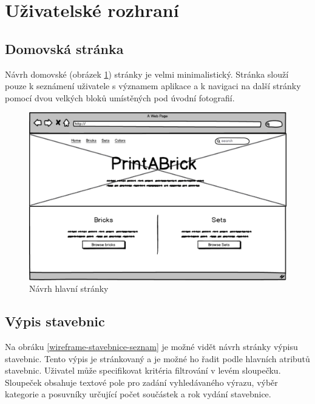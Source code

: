 \section{Uživatelské rozhraní}

\subsection{Domovská stránka}
Návrh domovské (obrázek \ref{wireframe-hlavni}) stránky je velmi minimalistický. Stránka slouží pouze k seznámení uživatele s významem aplikace a k navigaci na další stránky pomocí dvou velkých bloků umístěných pod úvodní fotografií.

\begin{figure}[htbp]
    \centering
    \includegraphics[width=\textwidth,height=\textheight,keepaspectratio]{pdfs/wireframe_home.pdf}
    \caption{Návrh hlavní stránky}\label{wireframe-hlavni}
\end{figure}


\subsection{Výpis stavebnic}
Na obráku \ref{wireframe-stavebnice-seznam} je možné vidět návrh stránky výpisu stavebnic. Tento výpis je stránkovaný a je možné ho řadit podle hlavních atributů stavebnic. Uživatel může specifikovat kritéria filtrování v levém sloupečku. Sloupeček obsahuje textové pole pro zadání vyhledávaného výrazu, výběr kategorie a posuvníky určující počet součástek a rok vydání stavebnice.

